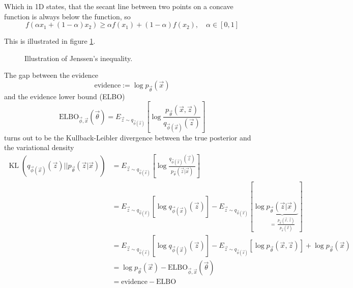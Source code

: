 Which in 1D states, that the secant line between two points on a concave function is always below the function, so
\begin{equation}
    f(\alpha x_1 + (1-\alpha) x_2) \geq \alpha f(x_1) + (1-\alpha) f(x_2), \quad \alpha \in [0,1]
\end{equation}

This is illustrated in figure \ref{fig:jenssen}.

\begin{figure}[H]
    \centering
    
    \caption{Illustration of Jenssen's inequality.}
    \label{fig:jenssen}
\end{figure}

The gap between the evidence
\begin{equation}
    \text{evidence} := \log p_\vec{\theta}(\vec{x})
\end{equation}
and the evidence lower bound (ELBO)
\begin{equation}
    \text{ELBO}_{\vec{\phi},\vec{x}}(\vec{\theta}) = E_{\vec{z} \sim q_{\vec{\phi}(\vec{x})}} \left[ \log \frac{p_\vec{\theta}(\vec{x},\vec{z})}{q_{\vec{\phi}(\vec{x})}(\vec{z})} \right]
\end{equation}
turns out to be the Kullback-Leibler divergence between the true posterior and the variational density
\begin{equation}
    \begin{aligned}
        \operatorname{KL}(q_{\vec{\phi}(\vec{x})}(\vec{z}) || p_{\vec{\theta}}(\vec{z} | \vec{x})) &= E_{\vec{z} \sim q_{\vec{\phi}(\vec{x})}} \left[ \log \frac{q_{\vec{\phi}(\vec{x})}(\vec{z})}{p_{\vec{\theta}}(\vec{z} | \vec{x})} \right] \\
        &= E_{\vec{z} \sim q_{\vec{\phi}(\vec{x})}} \left[ \log q_{\vec{\phi}(\vec{x})}(\vec{z})\right] - E_{\vec{z} \sim q_{\vec{\phi}(\vec{x})}} \left[ \log \underbrace{p_{\vec{\theta}}(\vec{z} | \vec{x})}_{=\, \frac{p_\vec{\theta}(\vec{x},\vec{z})}{p_\vec{\theta}(\vec{x})}} \right] \\
        &= E_{\vec{z} \sim q_{\vec{\phi}(\vec{x})}} \left[ \log q_{\vec{\phi}(\vec{x})}(\vec{z})\right] - E_{\vec{z} \sim q_{\vec{\phi}(\vec{x})}} \left[ \log p_{\vec{\theta}}(\vec{x},\vec{z}) \right] + \log p_\vec{\theta}(\vec{x}) \\
        &= \log p_\vec{\theta}(\vec{x}) - \text{ELBO}_{\vec{\phi},\vec{x}}(\vec{\theta}) \\
        &= \text{evidence} - \text{ELBO}
    \end{aligned}
\end{equation}

